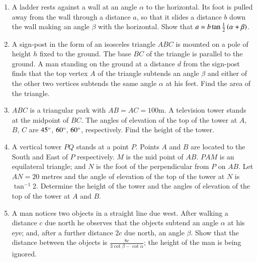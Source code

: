 \begin{enumerate}[label=\thesubsection.\arabic*,ref=\thesubsection.\theenumi]
%
\hfill{}
%
\item A ladder rests against a wall at an angle $\alpha$ to the horizontal. Its foot is pulled away from the wall through a distance $a$, so that it slides a distance $b$ down the wall making an angle $\beta$ with the horizontal. Show that $a=b\tan{\frac{1}{2}\ensuremath{\left(\alpha+\beta\right)}}$.
%
\hfill{}
\item A sign-post in the form of an isosceles triangle $ABC$ is mounted on a pole of height $h$ fixed to the ground. The base $BC$ of the triangle is parallel to the ground. A man standing on the ground at a distance $d$ from the sign-post finds that the top vertex $A$ of the triangle subtends an angle $\beta$ and either of the other two vertices subtends the same angle $\alpha$ at his feet. Find the area of the triangle. 
%
\hfill{}
%
\item $ABC$ is a triangular park with $AB=AC=100$m. A television tower stands at the midpoint of $BC$. The angles of elevation of the top of the tower at $A$, $B$, $C$ are $45\degree$, $60\degree$, $60\degree$, respectively. Find the height of the tower. 
%
\hfill{}
%
\item A vertical tower $PQ$ stands at a point $P$. Points $A$ and $B$ are located to the South and East of $P$ respectively. $M$ is the mid point of $AB$. $PAM$ is an equilateral triangle; and $N$ is the foot of the perpendicular from $P$ on $AB$. Let $AN=20$ metres and the angle of elevation of the top of the tower at $N$ is $\tan^{-1}{2}$. Determine the height of the tower and the angles of elevation of the top of the tower at $A$ and $B$.
%
\hfill{}
%
\item A man notices two objects in a straight line due west. After walking a distance $c$ due north he observes that the objects subtend an angle $\alpha$ at his eye; and, after a further distance $2c$ due north, an angle $\beta$. Show that the distance between the objects is $\frac{8c}{3\cot{\beta}-\cot{\alpha}}$; the height of the man is being ignored. 
%
\hfill{}
\end{enumerate}

